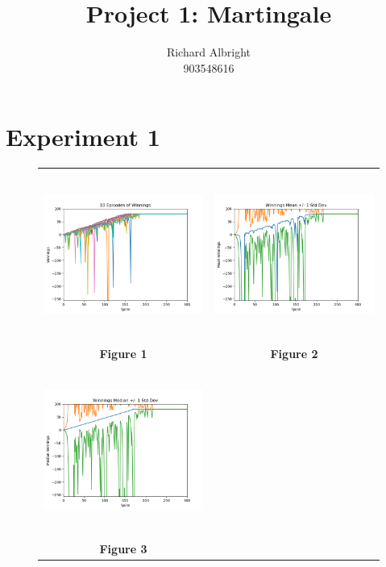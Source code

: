 \documentclass[
	letterpaper, %
]{jdf}
\author{
	Richard Albright \\
	903548616}
\title{Project 1: Martingale}
\begin{document}

\maketitle

\section{Experiment 1}

\begin{figure}[h]
	\begin{tabular}{cc}
		\includegraphics[height=5.5cm]{figure_1.png} & \includegraphics[height=5.5cm]{figure_2.png} \\
		\textbf{Figure 1} & \textbf{Figure 2} \\
		\includegraphics[height=5.5cm]{figure_3.png} & \\
		\textbf{Figure 3} & \\
	\end{tabular}
\end{figure}
\end{document}
